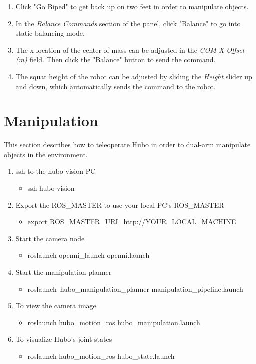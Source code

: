 \documentclass[letterpaper, 10 pt]{report}
\begin{document}
\begin{enumerate}
    \item Click "Go Biped" to get back up on two feet in order to manipulate objects.
    \item In the \textit{Balance Commands} section of the panel, click "Balance" to go into static balancing mode.
    \item The x-location of the center of mass can be adjusted in the \textit{COM-X Offset (m)} field. Then click the "Balance" button to send the command.
    \item The squat height of the robot can be adjusted by sliding the \textit{Height} slider up and down, which automatically sends the command to the robot.
  \end{enumerate}

\section{Manipulation}
This section describes how to teleoperate Hubo in order to dual-arm manipulate objects in the environment.
\begin{enumerate}
  \item ssh to the hubo-vision PC
    \begin{itemize}
      \item ssh hubo-vision
    \end{itemize}
  \item Export the ROS\_MASTER to use your local PC's ROS\_MASTER
    \begin{itemize}
      \item export ROS\_MASTER\_URI=http://YOUR\_LOCAL\_MACHINE
    \end{itemize}
  \item Start the camera node
    \begin{itemize}
      \item roslaunch openni\_launch openni.launch
    \end{itemize}
  \item Start the manipulation planner
    \begin{itemize} 
      \item roslaunch\ hubo\_manipulation\_planner manipulation\_pipeline.launch
    \end{itemize}
  \item To view the camera image
    \begin{itemize}
      \item roslaunch hubo\_motion\_ros hubo\_manipulation.launch
    \end{itemize}
  \item To visualize Hubo's joint states
    \begin{itemize}
      \item roslaunch hubo\_motion\_ros hubo\_state.launch
    \end{itemize}
\end{enumerate}
\end{document}

